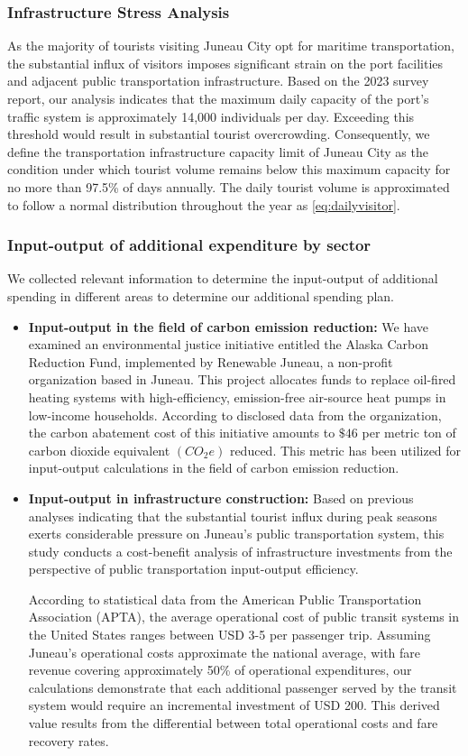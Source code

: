 \documentclass{mcmthesis}
\begin{document}
\subsubsection{Infrastructure Stress Analysis}
As the majority of tourists visiting Juneau City opt for maritime transportation, the substantial influx of visitors imposes significant strain on the port facilities and adjacent public transportation infrastructure. Based on the 2023 survey report, our analysis indicates that the maximum daily capacity of the port’s traffic system is approximately 14,000 individuals per day. Exceeding this threshold would result in substantial tourist overcrowding. Consequently, we define the transportation infrastructure capacity limit of Juneau City as the condition under which tourist volume remains below this maximum capacity for no more than 97.5\% of days annually. The daily tourist volume is approximated to follow a normal distribution throughout the year as \eqref{eq:dailyvisitor}.\par  
\subsubsection{Input-output of additional expenditure by sector}
We collected relevant information to determine the input-output of additional spending in different areas to determine our additional spending plan.
\begin{itemize}
  \item \textbf{Input-output in the field of carbon emission reduction:} We have examined an environmental justice initiative entitled the Alaska Carbon Reduction Fund, implemented by Renewable Juneau, a non-profit organization based in Juneau. This project allocates funds to replace oil-fired heating systems with high-efficiency, emission-free air-source heat pumps in low-income households. According to disclosed data from the organization, the carbon abatement cost of this initiative amounts to $\$46$ per metric ton of carbon dioxide equivalent $(CO_2e)$ reduced. This metric has been utilized for input-output calculations in the field of carbon emission reduction.
  \item \textbf{Input-output in infrastructure construction:} Based on previous analyses indicating that the substantial tourist influx during peak seasons exerts considerable pressure on Juneau's public transportation system, this study conducts a cost-benefit analysis of infrastructure investments from the perspective of public transportation input-output efficiency.\par
  According to statistical data from the American Public Transportation Association (APTA), the average operational cost of public transit systems in the United States ranges between USD 3-5 per passenger trip. Assuming Juneau's operational costs approximate the national average, with fare revenue covering approximately 50\% of operational expenditures, our calculations demonstrate that each additional passenger served by the transit system would require an incremental investment of USD 200. This derived value results from the differential between total operational costs and fare recovery rates.
\end{itemize} 
\end{document}
